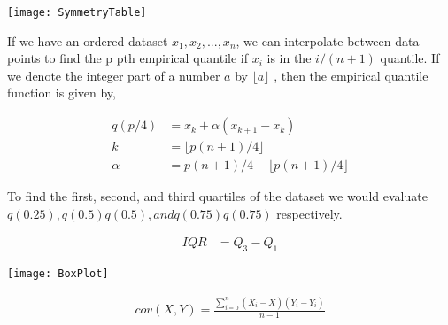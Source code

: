 {

    \vspace*{.1in}
    \texttt{[image: SymmetryTable]}
}


{

    If we have an ordered dataset $ x_{1},x_{2},...,x_{n}$, we can interpolate
    between data points to find the p pth empirical quantile if $x_{i}$ is in
    the ${\displaystyle i/(n+1)}$ quantile. If we denote the integer part of a
    number $a$ by $\lfloor a\rfloor$ , then the empirical quantile function is
    given by,

    \begin{align*}
        q(p/4) &= x_k + \alpha ( x_{k + 1} - x_k ) \\
        k &=\lfloor p(n+1)/4\rfloor \\
        \alpha &=p(n+1)/4-\lfloor p(n+1)/4\rfloor
    \end{align*}

    To find the first, second, and third quartiles of the dataset we would
    evaluate $q(0.25), q ( 0.5 ) q(0.5), and q ( 0.75 ) q(0.75)$ respectively. 

}

{
    \begin{align*}
        IQR &= Q_3-Q_1
    \end{align*}
}


{
    \vspace*{.1in}
    \texttt{[image: BoxPlot]}
}

{
    \begin{align*}
        cov(X,Y) = \frac{\sum_{i=0}^{n} (X_i-\overline{X})(Y_i-\overline{Y_i})}{n-1}
    \end{align*}
}
